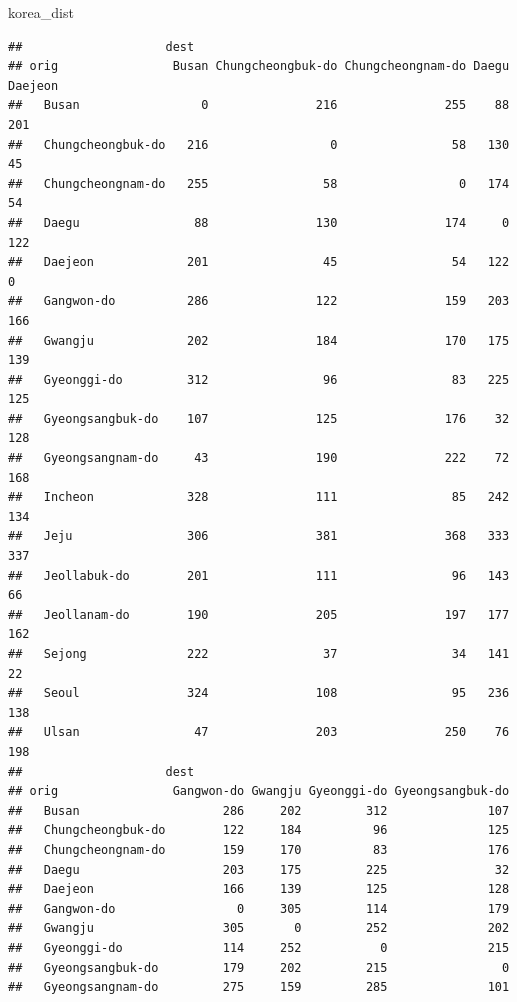 \documentclass[
]{book}
\newenvironment{Shaded}{\begin{snugshade}}{\end{snugshade}}
\newcommand{\NormalTok}[1]{#1}
\begin{document}
\begin{Shaded}
\begin{Highlighting}[]
\NormalTok{korea\_dist}
\end{Highlighting}
\end{Shaded}

\begin{verbatim}
##                    dest
## orig                Busan Chungcheongbuk-do Chungcheongnam-do Daegu Daejeon
##   Busan                 0               216               255    88     201
##   Chungcheongbuk-do   216                 0                58   130      45
##   Chungcheongnam-do   255                58                 0   174      54
##   Daegu                88               130               174     0     122
##   Daejeon             201                45                54   122       0
##   Gangwon-do          286               122               159   203     166
##   Gwangju             202               184               170   175     139
##   Gyeonggi-do         312                96                83   225     125
##   Gyeongsangbuk-do    107               125               176    32     128
##   Gyeongsangnam-do     43               190               222    72     168
##   Incheon             328               111                85   242     134
##   Jeju                306               381               368   333     337
##   Jeollabuk-do        201               111                96   143      66
##   Jeollanam-do        190               205               197   177     162
##   Sejong              222                37                34   141      22
##   Seoul               324               108                95   236     138
##   Ulsan                47               203               250    76     198
##                    dest
## orig                Gangwon-do Gwangju Gyeonggi-do Gyeongsangbuk-do
##   Busan                    286     202         312              107
##   Chungcheongbuk-do        122     184          96              125
##   Chungcheongnam-do        159     170          83              176
##   Daegu                    203     175         225               32
##   Daejeon                  166     139         125              128
##   Gangwon-do                 0     305         114              179
##   Gwangju                  305       0         252              202
##   Gyeonggi-do              114     252           0              215
##   Gyeongsangbuk-do         179     202         215                0
##   Gyeongsangnam-do         275     159         285              101

\end{verbatim}
\end{document}
